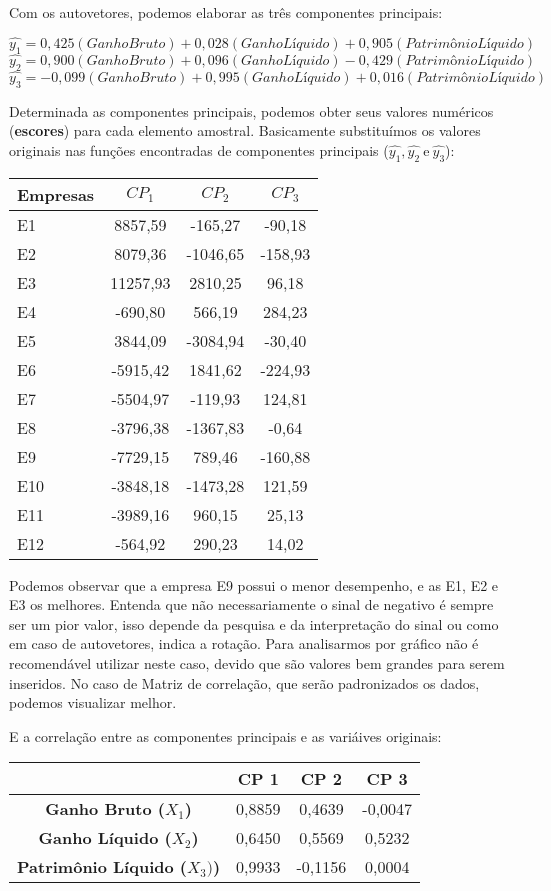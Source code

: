 \documentclass[
]{book}
\begin{document}
Com os autovetores, podemos elaborar as três componentes principais:

\[\hat{y_1}=0,425(Ganho Bruto)+0,028(GanhoLíquido)+0,905(PatrimônioLíquido)\]
\[\hat{y_2}=0,900(Ganho Bruto)+0,096(GanhoLíquido)-0,429(PatrimônioLíquido)\]
\[\hat{y_3}=-0,099(Ganho Bruto)+0,995(GanhoLíquido)+0,016(PatrimônioLíquido)\]

Determinada as componentes principais, podemos obter seus valores numéricos (\textbf{escores}) para cada elemento amostral. Basicamente substituímos os valores originais nas funções encontradas de componentes principais (\(\hat{y_1},\hat{y_2} \ \mbox{e}\  \hat{y_3}\)):

\begin{longtable}[]{@{}lccc@{}}
\toprule
\textbf{Empresas} & \textbf{\(CP_1\)} & \textbf{\(CP_2\)} & \textbf{\(CP_3\)}\tabularnewline
\midrule
\endhead
E1 & 8857,59 & -165,27 & -90,18\tabularnewline
E2 & 8079,36 & -1046,65 & -158,93\tabularnewline
E3 & 11257,93 & 2810,25 & 96,18\tabularnewline
E4 & -690,80 & 566,19 & 284,23\tabularnewline
E5 & 3844,09 & -3084,94 & -30,40\tabularnewline
E6 & -5915,42 & 1841,62 & -224,93\tabularnewline
E7 & -5504,97 & -119,93 & 124,81\tabularnewline
E8 & -3796,38 & -1367,83 & -0,64\tabularnewline
E9 & -7729,15 & 789,46 & -160,88\tabularnewline
E10 & -3848,18 & -1473,28 & 121,59\tabularnewline
E11 & -3989,16 & 960,15 & 25,13\tabularnewline
E12 & -564,92 & 290,23 & 14,02\tabularnewline
\bottomrule
\end{longtable}

Podemos observar que a empresa E9 possui o menor desempenho, e as E1, E2 e E3 os melhores. Entenda que não necessariamente o sinal de negativo é sempre ser um pior valor, isso depende da pesquisa e da interpretação do sinal ou como em caso de autovetores, indica a rotação. Para analisarmos por gráfico não é recomendável utilizar neste caso, devido que são valores bem grandes para serem inseridos. No caso de Matriz de correlação, que serão padronizados os dados, podemos visualizar melhor.

E a correlação entre as componentes principais e as variáives originais:

\begin{longtable}[]{@{}cccc@{}}
\toprule
& \textbf{CP 1} & \textbf{CP 2} & \textbf{CP 3}\tabularnewline
\midrule
\endhead
\textbf{Ganho Bruto (\(X_1\))} & 0,8859 & 0,4639 & -0,0047\tabularnewline
\textbf{Ganho Líquido (\(X_2\))} & 0,6450 & 0,5569 & 0,5232\tabularnewline
\textbf{Patrimônio Líquido (\(X_3)\))} & 0,9933 & -0,1156 & 0,0004\tabularnewline
\bottomrule
\end{longtable}
\end{document}
